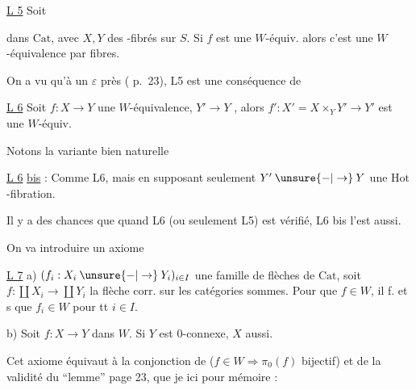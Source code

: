 
\uline{L 5} Soit


dans $\mathrm{Cat}$, avec $X,Y$ des -fibrés sur $S$. Si $f$ est une  $W$-équiv.  alors c'est une $W$-équivalence par fibres.

On a vu qu'à un $\varepsilon$ près ( p.~23), L5 est une conséquence de

\uline{L 6}  Soit $f:X\longrightarrow Y$ une $W$-équivalence, $Y'\longrightarrow Y$   , alors $f':X'=X\times_Y Y'\longrightarrow Y'$ est une $W$-équiv.

Notons la variante bien naturelle

\uline{L 6} \uline{bis} : Comme L6,  mais en supposant seulement $Y'\mathbin{\unsure{-|\to}}Y$ une $\mathrm{Hot}$-fibration.

Il y a des chances que  quand L6 (ou seulement L5) est vérifié, L6 bis l'est aussi.

On va introduire un axiome

\uline{L 7} a)  $(f_i:X_i\mathbin{\unsure{-|\to}}Y_i)_{i\in I}$ une famille de flèches de $\mathrm{Cat}$, soit $f:\coprod X_i\longrightarrow\coprod Y_i$ la flèche  corr. sur les catégories sommes. Pour que $f\in W$,  il f. et s que $f_i\in W$ pour tt $i\in I$.

b) Soit $f:X\longrightarrow Y$ dans $W$. Si $Y$ est $0$-connexe, $X$ aussi.

Cet axiome équivaut à la conjonction de  ($f\in W\Longrightarrow\pi_0(f)$ bijectif) et de la validité du ``lemme'' page 23, que je  ici pour mémoire :

